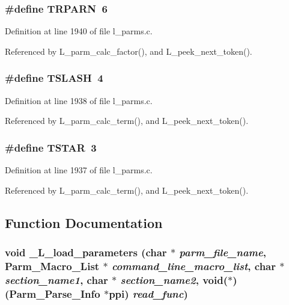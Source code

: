 \subsubsection{\setlength{\rightskip}{0pt plus 5cm}\#define TRPARN~6}\label{l__parms_8c_2132051c32c4d62671b5760afb92bdc6}




Definition at line 1940 of file l\_\-parms.c.

Referenced by L\_\-parm\_\-calc\_\-factor(), and L\_\-peek\_\-next\_\-token().
\subsubsection{\setlength{\rightskip}{0pt plus 5cm}\#define TSLASH~4}\label{l__parms_8c_90cc25bfce659c3fea0b263002d9c325}




Definition at line 1938 of file l\_\-parms.c.

Referenced by L\_\-parm\_\-calc\_\-term(), and L\_\-peek\_\-next\_\-token().
\subsubsection{\setlength{\rightskip}{0pt plus 5cm}\#define TSTAR~3}\label{l__parms_8c_76b814f2784fb1774481f493a4e55595}




Definition at line 1937 of file l\_\-parms.c.

Referenced by L\_\-parm\_\-calc\_\-term(), and L\_\-peek\_\-next\_\-token().

\subsection{Function Documentation}
\subsubsection{\setlength{\rightskip}{0pt plus 5cm}void \_\-L\_\-load\_\-parameters (char $\ast$ {\em parm\_\-file\_\-name}, \bf{Parm\_\-Macro\_\-List} $\ast$ {\em command\_\-line\_\-macro\_\-list}, char $\ast$ {\em section\_\-name1}, char $\ast$ {\em section\_\-name2}, void($\ast$)(\bf{Parm\_\-Parse\_\-Info} $\ast$ppi) {\em read\_\-func})}\label{l__parms_8c_ed7d1db7730c25bb4f8eda913ba2fc9b}




